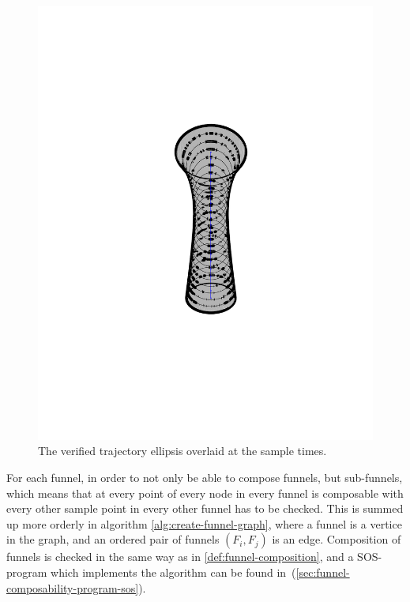 \begin{figure}
\begin{minipage}[b]{0.4\textwidth}
    \includegraphics[width=\textwidth]{figures/method/funnel-sampled}
    \caption{The verified trajectory ellipsis overlaid at the sample times.}
  \end{minipage}
\end{figure}

For each funnel, in order to not only be able to compose funnels, but
sub-funnels, which means that at every point of every node in every funnel is
composable with every other sample point in every other funnel has to be
checked. This is summed up more orderly in algorithm
\ref{alg:create-funnel-graph}, where a funnel is a vertice in the graph, and an
ordered pair of funnels \(\left( F_{i}, F_{j} \right)\) is an edge. Composition
of funnels is checked in the same way as in \ref{def:funnel-composition}, and a
\ac{SOS}-program which implements the algorithm can be found
in~(\ref{sec:funnel-composability-program-sos}).

